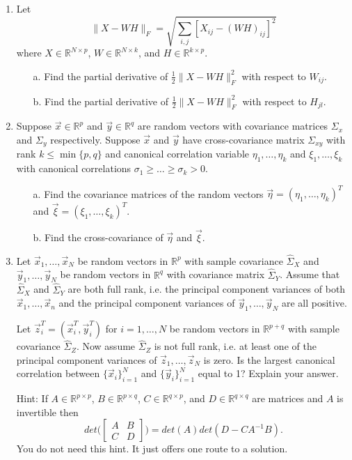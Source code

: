 \documentclass[12 point]{article}
\begin{document}
\begin{enumerate}
\newpage
\item Let $$ \| X - WH\|_F = \sqrt{\sum_{i,j}[X_{ij} - (WH)_{ij}]^2}$$ where $X \in \mathbb{R}^{N\times p}$, $W\in \mathbb{R}^{N\times k}$, and $H\in \mathbb{R}^{k\times p}$.
\begin{itemize}
\item[a.] Find the partial derivative of $\frac{1}{2}\| X - WH\|_F^2$ with respect to $W_{ij}$.
\vspace{9 cm}
\item[b.] Find the partial derivative of $\frac{1}{2}\| X - WH\|_F^2$ with respect to $H_{jl}$.
\end{itemize}

\newpage
\item Suppose $\vec{x} \in \mathbb{R}^p$ and $\vec{y} \in \mathbb{R}^q$ are random vectors with covariance matrices $\Sigma_x$ and $\Sigma_y$ respectively.  Suppose $\vec{x}$ and $\vec{y}$ have cross-covariance matrix $\Sigma_{xy}$ with rank $k \le \min \{p,q\}$ and canonical correlation variable $\eta_1,\dots,\eta_k$ and $\xi_1,\dots,\xi_k$ with canonical correlations $\sigma_1\ge \dots \ge \sigma_k>0$.  
	\begin{itemize}
 	 \item[a.]  Find the covariance matrices of the random vectors $\vec{\eta} = 					(\eta_1,\dots,\eta_k)^T$ and $\vec{\xi} = (\xi_1,\dots,\xi_k)^T.$
    		\vspace{8 cm}
   	 \item[b.]  Find the cross-covariance of $\vec{\eta}$ and $\vec{\xi}.$
    \end{itemize}


\newpage
\item Let $\vec{x}_1,\dots,\vec{x}_N$ be random vectors in $\mathbb{R}^p$ with sample covariance $\hat{\Sigma}_X$ and $\vec{y}_1,\dots,\vec{y}_N$ be random vectors in $\mathbb{R}^q$ with covariance matrix $\hat{\Sigma}_Y$.  Assume that $\hat{\Sigma}_X$ and $\hat{\Sigma}_Y$ are both full rank, i.e. the principal component variances of both $\vec{x}_1,\dots,\vec{x}_n$ and the principal component variances of $\vec{y}_1,\dots,\vec{y}_N$ are all positive.  

Let $\vec{z}_i ^T = (\vec{x}_i^T,\vec{y}_i^T)$ for $i=1,\dots,N$ be random vectors in $\mathbb{R}^{p+q}$ with sample covariance $\hat{\Sigma}_Z.$  Now assume $\hat{\Sigma}_Z$ is not full rank, i.e. at least one of the principal component variances of $\vec{z}_1,\dots,\vec{z}_N$ is zero. Is the largest canonical correlation between $\{\vec{x}_i\}_{i=1}^N$ and $\{\vec{y}_i\}_{i=1}^N$ equal to 1?  Explain your answer.  

Hint: If $A\in\mathbb{R}^{p \times p}$, $B\in\mathbb{R}^{p\times q}$, $C\in \mathbb{R}^{q\times p}$, and $D\in\mathbb{R}^{q\times q}$ are matrices and $A$ is invertible then
$$det\bigg(\begin{bmatrix} A&B\\C& D\end{bmatrix} \bigg) = det(A) det(D - CA^{-1}B).$$  You do not need this hint. It just offers one route to a solution.

\end{enumerate}
\end{document}
